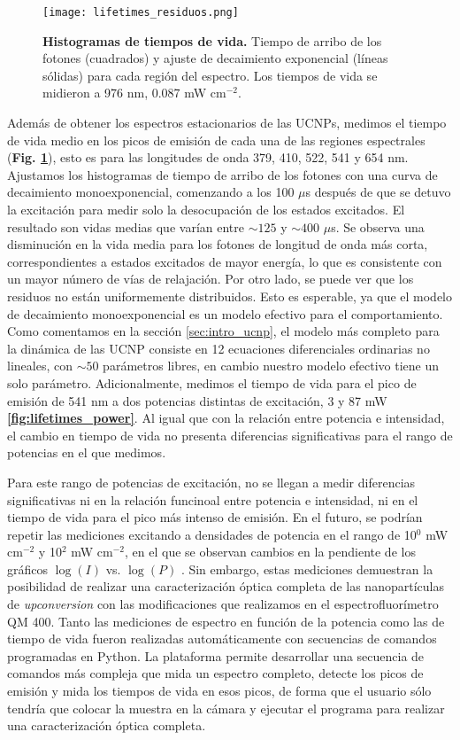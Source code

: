 \begin{figure}[t]
    \centering
    \texttt{[image: lifetimes\_residuos.png]}
    \caption{\textbf{Histogramas de tiempos de vida.} Tiempo de arribo de los fotones (cuadrados) y ajuste de decaimiento exponencial (líneas sólidas) para cada región del espectro. Los tiempos de vida se midieron a 976 nm, 0.087 mW cm$^{-2}$.}
    \label{fig:lifetimes}
\end{figure}

Además de obtener los espectros estacionarios de las UCNPs, medimos el tiempo de vida medio en los picos de emisión de cada una de las regiones espectrales (\textbf{Fig. \ref{fig:lifetimes}}), esto es para las longitudes de onda 379, 410, 522, 541 y 654 nm.
Ajustamos los histogramas de tiempo de arribo de los fotones con una curva de decaimiento monoexponencial, comenzando a los 100 $\mu$s después de que se detuvo la excitación para medir solo la desocupación de los estados excitados.  
El resultado son vidas medias que varían entre $\sim125$ y $\sim400$ $\mu$s.  
Se observa una disminución en la vida media para los fotones de longitud de onda más corta, correspondientes a estados excitados de mayor energía, lo que es consistente con un mayor número de vías de relajación. 
Por otro lado, se puede ver que los residuos no están uniformemente distribuidos.
Esto es esperable, ya que el modelo de decaimiento monoexponencial es un modelo efectivo para el comportamiento.
Como comentamos en la sección \ref{sec:intro_ucnp}, el modelo más completo para la dinámica de las UCNP consiste en 12 ecuaciones diferenciales ordinarias no lineales, con $\sim 50$ parámetros libres, en cambio nuestro modelo efectivo tiene un solo parámetro.
Adicionalmente, medimos el tiempo de vida para el pico de emisión de 541 nm a dos potencias distintas de excitación, 3 y 87 mW \textbf{\ref{fig:lifetimes_power}}.
Al igual que con la relación entre potencia e intensidad, el cambio en tiempo de vida no presenta diferencias significativas para el rango de potencias en el que medimos.

Para este rango de potencias de excitación, no se llegan a medir diferencias significativas ni en la relación funcinoal entre potencia e intensidad, ni en el tiempo de vida para el pico más intenso de emisión.
En el futuro, se podrían repetir las mediciones excitando a densidades de potencia en el rango de 10$^0$ mW cm$^{-2}$ y 10$^2$ mW cm$^{-2}$, en el que se observan cambios en la pendiente de los gráficos $\log(I)$ vs. $\log(P)$ \cite{bujjamer_luminescent_2020}.
Sin embargo, estas mediciones demuestran la posibilidad de realizar una caracterización óptica completa de las nanopartículas de \textit{upconversion} con las modificaciones que realizamos en el espectrofluorímetro QM 400.
Tanto las mediciones de espectro en función de la potencia como las de tiempo de vida fueron realizadas automáticamente con secuencias de comandos programadas en Python.
La plataforma permite desarrollar una secuencia de comandos más compleja que mida un espectro completo, detecte los picos de emisión y mida los tiempos de vida en esos picos, de forma que el usuario sólo tendría que colocar la muestra en la cámara y ejecutar el programa para realizar una caracterización óptica completa.




